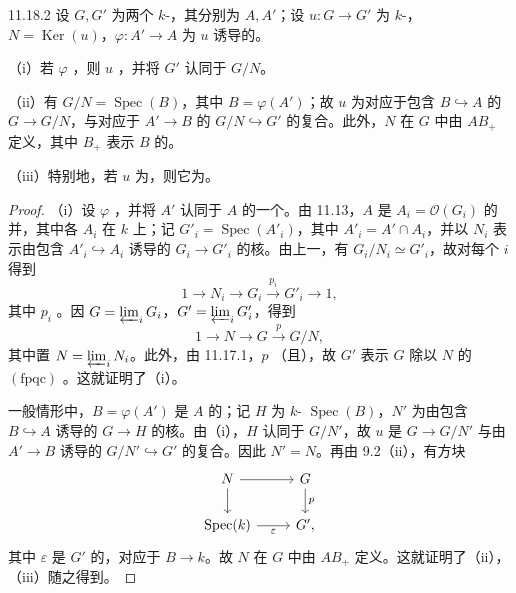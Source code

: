 \begin{SGAresult}{}{11.18.2}
设 $G,G'$ 为两个 $k$-，其分别为 $A,A'$；设 $u:G\to G'$ 为 $k$-，$N=\operatorname{Ker}(u)$，$\varphi:A'\to A$ 为 $u$ 诱导的。

（i）若 $\varphi$ ，则 $u$ ，并将 $G'$ 认同于 $G/N$。

（ii）有 $G/N=\operatorname{Spec}(B)$，其中 $B=\varphi(A')$；故 $u$ 为对应于包含 $B\hookrightarrow A$ 的 $G\to G/N$，与对应于 $A'\to B$ 的 $G/N\hookrightarrow G'$ 的复合。此外，$N$ 在 $G$ 中由 $AB_+$ 定义，其中 $B_+$ 表示 $B$ 的。

（iii）特别地，若 $u$ 为，则它为。
\end{SGAresult}
\begin{proof}
（i）设 $\varphi$ ，并将 $A'$ 认同于 $A$ 的一个。由 11.13，$A$ 是 $A_i=\mathcal O(G_i)$ 的并，其中各 $A_i$ 在 $k$ 上；记 $G'_i=\operatorname{Spec}(A'_i)$，其中 $A'_i=A'\cap A_i$，并以 $N_i$ 表示由包含 $A'_i\hookrightarrow A_i$ 诱导的 $G_i\to G'_i$ 的核。由上一，有 $G_i/N_i\simeq G'_i$，故对每个 $i$ 得到
\[
1\longrightarrow N_i\longrightarrow G_i\xrightarrow{p_i}G'_i\longrightarrow1,
\]
其中 $p_i$ 。因 $G=\varprojlim_i G_i$，$G'=\varprojlim_i G'_i$，得到
\[
1\longrightarrow N\longrightarrow G\xrightarrow{p}G/N,
\]
其中置 $N=\varprojlim_i N_i$。此外，由 11.17.1，$p$ （且），故 $G'$ 表示 $G$ 除以 $N$ 的 $(\mathrm{fpqc})$ 。这就证明了（i）。

一般情形中，$B=\varphi(A')$ 是 $A$ 的；记 $H$ 为 $k$- $\operatorname{Spec}(B)$，$N'$ 为由包含 $B\hookrightarrow A$ 诱导的 $G\to H$ 的核。由（i），$H$ 认同于 $G/N'$，故 $u$ 是 $G\to G/N'$ 与由 $A'\to B$ 诱导的 $G/N'\hookrightarrow G'$ 的复合。因此 $N'=N$。再由 9.2（ii），有方块
\[
\begin{tikzcd}
N\arrow[r]\arrow[d]&G\arrow[d,"p"]\\
\operatorname{Spec}(k)\arrow[r,"\varepsilon"']&G',
\end{tikzcd}
\]
其中 $\varepsilon$ 是 $G'$ 的，对应于 $B\to k$。故 $N$ 在 $G$ 中由 $AB_+$ 定义。这就证明了（ii），（iii）随之得到。
\end{proof}

